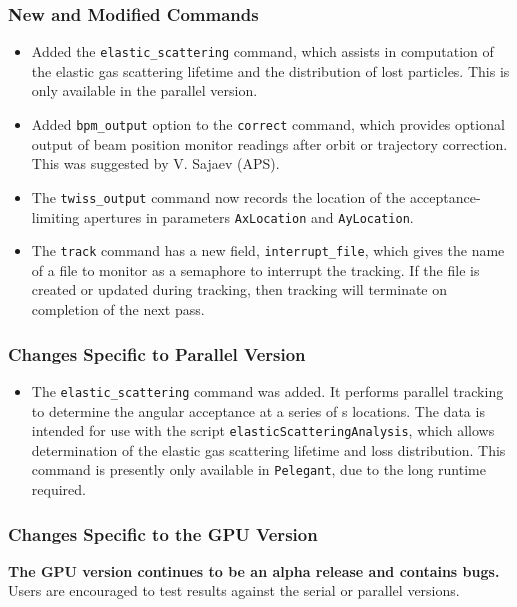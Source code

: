 \documentclass[11pt]{article}
\begin{document}
\subsubsection{New and Modified Commands}
\begin{itemize}
\item Added the \verb|elastic_scattering| command, which assists in computation of the elastic gas scattering
  lifetime and the distribution of lost particles. This is only available in the parallel version.
\item Added \verb|bpm_output| option to the \verb|correct| command, which provides optional output of beam position monitor
  readings after orbit or trajectory correction. This was suggested by V. Sajaev (APS).
\item The \verb|twiss_output| command now records the location of the acceptance-limiting apertures in parameters
  \verb|AxLocation| and \verb|AyLocation|.
\item The \verb|track| command has a new field, \verb|interrupt_file|, which gives the name of a file to monitor
  as a semaphore to interrupt the tracking. If the file is created or updated during tracking, then tracking will
  terminate on completion of the next pass.
\end{itemize}

\subsubsection{Changes Specific to Parallel Version}

\begin{itemize}
\item The \verb|elastic_scattering| command was added. It performs parallel tracking to determine the angular
  acceptance at a series of s locations. The data is intended for use with the script {\tt elasticScatteringAnalysis},
  which allows determination of the elastic gas scattering lifetime and loss distribution.
  This command is presently only available in \verb|Pelegant|, due to the long runtime required.
\end{itemize}

\subsubsection{Changes Specific to the GPU Version}

{\bf The GPU version continues to be an alpha release and contains bugs.}
Users are encouraged to test results against the serial or parallel versions.
\end{document}
